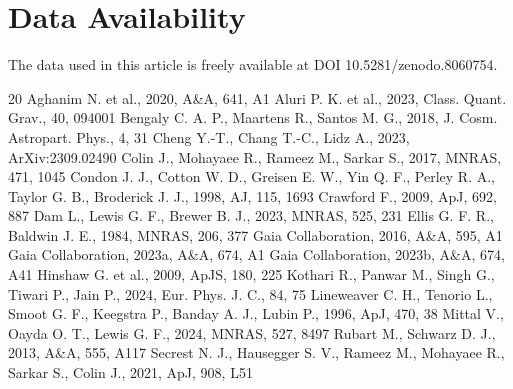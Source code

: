 \documentclass[fleqn,usenatbib]{mnras}
\begin{document}
\section*{Data Availability}
The data used in this article is freely available at DOI 10.5281/zenodo.8060754. 
\begin{thebibliography}{20}
 Aghanim N. et al., 2020, A\&A, 641, A1
 Aluri P. K. et al., 2023, Class. Quant. Grav., 40, 094001 
 Bengaly C. A. P., Maartens R., Santos M. G., 2018, J. Cosm. Astropart. Phys., 4, 31
 Cheng Y.-T., Chang T.-C., Lidz A., 2023, ArXiv:2309.02490
\bibitem{} Colin J., Mohayaee R., Rameez M., Sarkar S., 2017, MNRAS, 471, 1045
 Condon J. J., Cotton W. D., Greisen E. W., Yin Q. F., Perley R. A., Taylor G. B., Broderick J. J., 1998, AJ, 115, 1693
 Crawford F., 2009, ApJ, 692, 887
 Dam L., Lewis G. F., Brewer B. J., 2023, MNRAS, 525, 231 
 Ellis G. F. R., Baldwin  J. E., 1984, MNRAS, 206, 377 
 Gaia Collaboration, 2016, A\&A, 595, A1
 Gaia Collaboration, 2023a, A\&A, 674, A1
 Gaia Collaboration, 2023b, A\&A, 674, A41
 Hinshaw G. et al., 2009, ApJS, 180, 225
 Kothari R., Panwar M., Singh G., Tiwari P., Jain P., 2024, Eur. Phys. J. C.,
84, 75
 Lineweaver C. H., Tenorio L., Smoot G. F., Keegstra P., Banday A. J., Lubin P., 1996, ApJ, 470, 38
 Mittal V., Oayda O. T., Lewis G. F., 2024, MNRAS, 527, 8497
 Rubart M., Schwarz D. J., 2013, A\&A, 555, A117
 Secrest N. J., Hausegger S. V., Rameez M., Mohayaee R., Sarkar S., Colin J., 2021,  ApJ, 908, L51 

\end{thebibliography}
\end{document}

